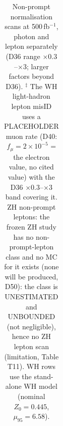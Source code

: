 \begin{table}[ht]
\begin{tabular}{lrrr}
\end{tabular}
\caption{Non-prompt normalisation scans at 500\,fb$^{-1}$, photon and lepton separately (D36 range $\times0.3$--$\times3$; larger factors beyond D36). $^\ddagger$ The WH light-hadron lepton misID uses a PLACEHOLDER muon rate (D40: $f_\mu=2\times10^{-5}$ = the electron value, no cited value) with the D36 $\times0.3$--$\times3$ band covering it. ZH non-prompt leptons: the frozen ZH study has no non-prompt-lepton class and no MC for it exists (none will be produced, D50): the class is UNESTIMATED and UNBOUNDED (not negligible), hence no ZH lepton scan (limitation, Table T11). WH rows use the stand-alone WH model (nominal $Z_0=0.445$, $\mu_{95}=6.58$).}
\end{table}
